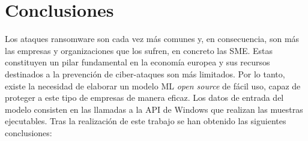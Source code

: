 \section{Conclusiones} \label{conclusiones}
\noindent Los ataques ransomware son cada vez más comunes y, en consecuencia, son más las empresas y organizaciones que los sufren, en concreto las \gls{SME}. Estas constituyen un pilar fundamental en la economía europea y sus recursos destinados a la prevención de ciber-ataques son más limitados. Por lo tanto, existe la necesidad de elaborar un modelo \gls{ML} \textit{open source} de fácil uso, capaz de proteger a este tipo de empresas de manera eficaz. Los datos de entrada del modelo consisten en las llamadas a la \gls{API} de Windows que realizan las muestras ejecutables. Tras la realización de este trabajo se han obtenido las siguientes conclusiones:


